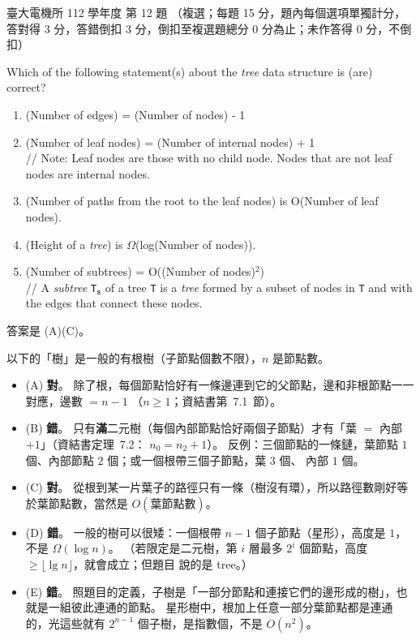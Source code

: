 \begin{pastexam}[label={px:ntu-112-ee-ds-12}]{臺大電機所 112 學年度 第 12 題}
（複選；每題 15 分，題內每個選項單獨計分，答對得 3 分，答錯倒扣 3 分，倒扣至複選題總分 0 分為止；未作答得 0 分，不倒扣）

Which of the following statement(s) about the \textit{tree} data structure is (are) correct?
\begin{enumerate}[label=(\Alph*)]
\item (Number of edges) = (Number of nodes) - 1
\item (Number of leaf nodes) = (Number of internal nodes) + 1\\
// Note: Leaf nodes are those with no child node. Nodes that are not leaf nodes are internal nodes.
\item (Number of paths from the root to the leaf nodes) is O(Number of leaf nodes).
\item (Height of a \textit{tree}) is $\Omega$(log(Number of nodes)).
\item (Number of subtrees) = O((Number of nodes)$^2$)\\
// A \textit{subtree} \texttt{T}$_{\texttt{s}}$ of a tree \texttt{T} is a \textit{tree} formed by a subset of nodes in \texttt{T} and with the edges that connect these nodes.
\end{enumerate}
\end{pastexam}

\begin{pastsoln}
答案是 (A)(C)。

以下的「樹」是一般的有根樹（子節點個數不限），$n$ 是節點數。
\begin{itemize}
\item (A) \textbf{對}。 除了根，每個節點恰好有一條邊連到它的父節點，邊和非根節點一一對應，邊數 $= n - 1$
（$n \ge 1$；資結書第~7.1~節）。
\item (B) \textbf{錯}。 只有\textbf{滿}二元樹（每個內部節點恰好兩個子節點）才有「葉 $=$ 內部 $+ 1$」（資結書定理~7.2：
$n_0 = n_2 + 1$）。 反例：三個節點的一條鏈，葉節點 $1$ 個、內部節點 $2$ 個；或一個根帶三個子節點，葉 $3$ 個、
內部 $1$ 個。
\item (C) \textbf{對}。 從根到某一片葉子的路徑只有一條（樹沒有環），所以路徑數剛好等於葉節點數，當然是
$O(\text{葉節點數})$。
\item (D) \textbf{錯}。 一般的樹可以很矮：一個根帶 $n - 1$ 個子節點（星形），高度是 $1$，不是
$\Omega(\log n)$。 （若限定是二元樹，第 $i$ 層最多 $2^i$ 個節點，高度 $\ge \lfloor \lg n \rfloor$，就會成立；但題目
說的是 tree。）
\item (E) \textbf{錯}。 照題目的定義，子樹是「一部分節點和連接它們的邊形成的樹」，也就是一組彼此連通的節點。
星形樹中，根加上任意一部分葉節點都是連通的，光這些就有 $2^{n-1}$ 個子樹，是指數個，不是 $O(n^2)$。
\end{itemize}
\end{pastsoln}
